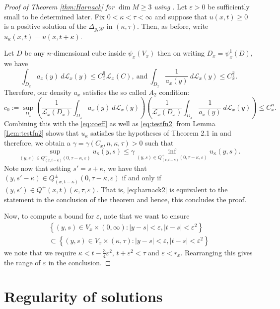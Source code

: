\documentclass[a4paper, 12pt]{amsart}
\numberwithin{equation}{section}
\renewcommand{\~}{\tilde}
\renewcommand{\-}{\bar}
\newcommand{\8}{\infty}
\newcommand{\cW}{\mathcal{W}}
\newcommand{\cbrac}[1]{\left(#1\right)}
\newcommand{\dbrac}[1]{\left\{#1\right\}}
\newcommand{\set}[1]{\dbrac{#1}}
\newcommand{\script}[1]{\mathscr{#1}}
\renewcommand{\epsilon}{\varepsilon}
\newcommand{\Leb}[1][{}]{\script{L}^{#1}}			%
\begin{document}
\begin{proof}[Proof of Theorem \ref{thm:Harnack} for $\dim M \geq 3$ using \cite{CS}]
Let $\epsilon > 0$ be sufficiently small to 
be determined later. 
Fix $0 < \kappa < \tau < \infty$ and suppose that $u(x,t) \geq 0$ 
is a positive solution of
the $\Delta_{g,\cW}$ in $(\kappa,\tau)$. 
Then, as before, write $u_\kappa(x,t) = u(x,t+\kappa)$.

Let $D$ be any $n$-dimensional cube inside $\psi_x(V_x)$ then 
on writing $D_x = \psi_x^{1}(D)$, we have  
$$ \int_{D_x} a_x(y)\ d\Leb_x(y) \leq C_x^{\frac{n}{2}} \Leb_x(C),
\ \text{and}\ 
\int_{D_x} \frac{1}{a_x(y)}\ d\Leb_x(y) \leq C_x^{\frac{n}{2}}.$$
Therefore, our density $a_x$ satisfies the so called $A_2$ condition:
$$c_0 := \sup_{D_x} \cbrac{ \frac{1}{\Leb_x(D_x)} \int_{D_x} a_x(y)\ d\Leb_x(y)}
\cbrac{ \frac{1}{\Leb_x(D_x)} \int_{D_x} \frac{1}{a_x(y)}\ d\Leb_x(y)} 
	\leq C_x^n.$$
Combining this with the \eqref{eq:coeff} as
well as \eqref{eq:testfn2} from Lemma \ref{Lem:testfn2} shows that $u_\kappa$
satisfies the hypotheses of Theorem 2.1 in \cite{CS} and
therefore, we obtain a $\gamma = \gamma(C_x, n, \kappa, \tau) > 0$
such that 
\begin{equation} 
\label{eq:harnack2} 
\sup_{(y,s) \in Q_{(x,t-\kappa)}^-(0, \tau - \kappa, \epsilon)} u_\kappa(y,s)
		\leq \gamma \inf_{(y,s) \in Q^+_{(x,t-\kappa)}(0, \tau - \kappa, \epsilon)} u_\kappa(y,s).
\end{equation}
Note now that setting $s' = s + \kappa$, we have that
$(y, s' - \kappa) \in Q^{\pm}_{(x,t- \kappa)}(0, \tau - \kappa, \epsilon)$
if and only if $(y, s') \in Q^{\pm}(x,t)(\kappa, \tau, \epsilon)$.
That is, \eqref{eq:harnack2} is equivalent to the statement 
in the conclusion of the theorem and hence, this concludes
the proof.

Now, to compute a bound for $\epsilon$, note that
we want to ensure 
\begin{multline*}\set{(y,s) \in V_x \times (0, \infty): |y - s| < \epsilon, |t - s| < \epsilon^2} \\
\subset \set{(y,s) \in V_x \times (\kappa, \tau): |y - s| < \epsilon, |t - s| < \epsilon^2}
\end{multline*} 
we note that we require $\kappa < t - \frac{3}{4} \epsilon^2$,
$t + \epsilon^2 < \tau$ and $\epsilon < r_x$.
Rearranging this gives the range of $\epsilon$
in the conclusion.
\end{proof} 

\section{Regularity of solutions}
\end{document}
